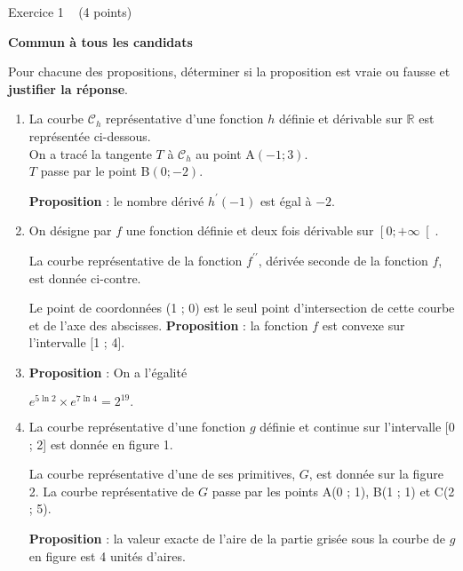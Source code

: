 
%
\begin{h2}Exercice 1   (4 points)\end{h2}
\textbf{Commun à tous les candidats}
\par
Pour chacune des propositions, déterminer si la proposition est vraie ou fausse et \textbf{justifier la réponse}.
\begin{enumerate}
     \item
     La courbe $\mathscr C_{h}$ représentative d'une fonction $h$ définie et dérivable sur $\mathbb{R}$ est représentée  ci-dessous.
\\
     On a tracé la tangente $T$ à $\mathscr C_{h}$ au point A$\left(- 1 ; 3\right)$.
\\     
     $T$ passe par le point B$\left(0 ;-2\right)$.

\begin{center}
\end{center}
     \textbf{Proposition}  : le nombre dérivé $h^{\prime}\left(-1\right)$ est égal à $-2$.
     \item
     On désigne par $f$ une fonction définie et deux fois dérivable sur $\left[0 ;+\infty \right[$.
     \par
     La courbe représentative de la fonction $f^{\prime\prime}$, dérivée seconde de la fonction $f$, est donnée ci-contre.
     \par
     Le point de coordonnées (1 ; 0) est le seul point d'intersection de cette courbe et de l'axe des abscisses.
     \textbf{Proposition} : la fonction $f$ est convexe sur l'intervalle [1 ; 4]. 
\begin{center}
\end{center}
     \item
     \textbf{Proposition} : On a l'égalité
     \par
     $e^{5\ln 2} \times  e^{7\ln 4}=2^{19}.$
     \item
     La courbe représentative d'une fonction $g$ définie et continue sur l'intervalle [0 ; 2] est donnée en figure 1.

\begin{center}
\end{center}
     La courbe représentative d'une de ses primitives, $G$, est donnée sur la figure 2. La courbe représentative de $G$ passe par les points A(0 ; 1), B(1 ; 1) et C(2 ; 5).

\begin{center}
\end{center}
     \textbf{Proposition} : la valeur exacte de l'aire de la partie grisée sous la courbe de $g$ en figure est 4 unités d'aires.
\end{enumerate}

